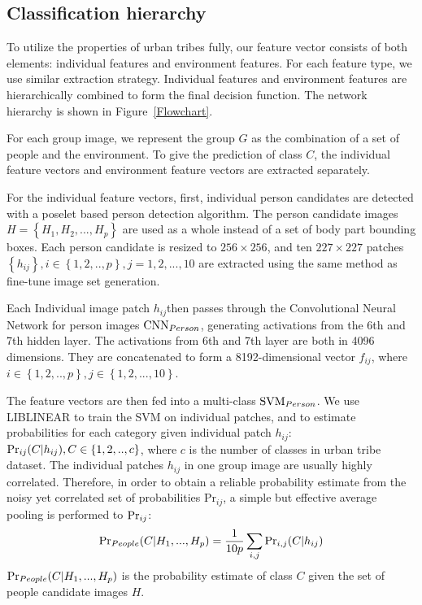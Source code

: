 \documentclass[10pt,twocolumn,letterpaper]{article}
\begin{document}
\subsection{Classification hierarchy}

To utilize the properties of urban tribes fully, our feature vector consists of both elements: individual features and environment features. For each feature type, we use similar extraction strategy. Individual features and environment features are hierarchically combined to form the final decision function.
The network hierarchy is shown in Figure~\ref{Flowchart}. 

For each group image, we represent the group $G$ as the combination of a set of people and the environment. To give the prediction of class $C$, the individual feature vectors and environment feature vectors are extracted separately.
 
For the individual feature vectors, first, individual person candidates are detected with a poselet based person detection algorithm. The person candidate images $H = \left\{H_{1}, H_{2}, ..., H_{p} \right\}$ are used as a whole instead of a set of body part bounding boxes. Each person candidate is resized to $256 \times 256$, and ten $227 \times 227$ patches $\left\{h_{ij}\right\}, i \in \left\{1,2,..,p\right\}, j=1,2,...,10$ are extracted using the same method as fine-tune image set generation. 

Each Individual image patch $h_{ij}$then passes through the Convolutional Neural Network for person images $\textup{CNN}_{Person}$, generating activations from the 6th and 7th hidden layer. The activations from 6th and 7th layer are both in 4096 dimensions. They are concatenated to form a 8192-dimensional vector $f_{ij}$, where $i \in \left\{1,2,..,p\right\}, j\in \left\{1,2,...,10\right\}$. 

The feature vectors are then fed into a multi-class $\textup{SVM}_{Person}$. We use LIBLINEAR\cite{liblinear} to train the SVM on individual patches, and to estimate probabilities for each category given individual patch $h_{ij}$: $\textup{Pr}_{ij}(C|h_{ij}), C \in \left\{1,2,..,c\right\}$, where $c$ is the number of classes in urban tribe dataset. The individual patches $h_{ij}$ in one group image are usually highly correlated. Therefore, in order to obtain a reliable probability estimate from the noisy yet correlated set of probabilities $\text{Pr}_{ij}$, a simple but effective average pooling is performed to $\textup{Pr}_{ij}$:
\begin{equation}
\textup{Pr}_{People}(C|H_{1}, ..., H_{p})=\frac{1}{10p}\sum_{i,j}\textup{Pr}_{i,j}(C|h_{ij})
\end{equation}
$\textup{Pr}_{People}(C|H_{1}, ..., H_{p})$ is the probability estimate of class $C$ given the set of people candidate images $H$. 
\end{document}

